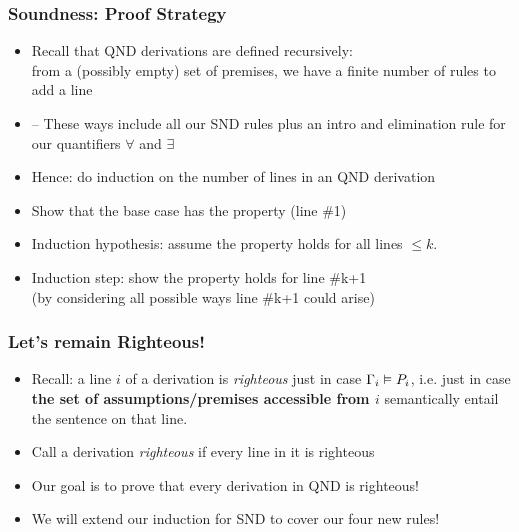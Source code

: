 \begin{frame}
\frametitle{Soundness: Proof Strategy}

\begin{itemize}

\item Recall that QND derivations are defined recursively: \\ from a (possibly empty) set of premises, we have a finite number of rules to add a line 

\item[] -- These ways include all our SND rules plus an intro and elimination rule for our quantifiers $\forall$ and $\exists$

\item Hence: do induction on the number of lines in an QND derivation

\item Show that the base case has the property (line \#1)

\item Induction hypothesis: assume the property holds for all lines $\leq k$. 

\item Induction step: show the property holds for line \#k+1 \\ (by considering all possible ways line \#k+1 could arise)

\end{itemize}
\end{frame}

\begin{frame}
\frametitle{Let's remain Righteous!}

\begin{itemize}[<+->]

\item Recall: a line $i$ of a derivation is \emph{righteous} just in case $\Gamma_i \vDash P_i$, i.e. just in case \textbf{the set of assumptions/premises accessible from $i$} semantically entail the sentence on that line. 

\item Call a derivation \textit{righteous} if every line in it is righteous

\item Our goal is to prove that every derivation in QND is righteous!

\item We will extend our induction for SND to cover our four new rules! 





\end{itemize}
\end{frame}

